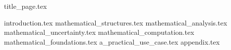 \documentclass{article}
\begin{document}
  \onehalfspacing
  \setlength{\parskip}{1.5em} 


  {title_page.tex}


  \tableofcontents

  \newpage


  {introduction.tex}
  {mathematical_structures.tex}
  {mathematical_analysis.tex}
  {mathematical_uncertainty.tex}
  {mathematical_computation.tex}
  {mathematical_foundations.tex}
  {a_practical_use_case.tex}
  {appendix.tex}
\end{document}
